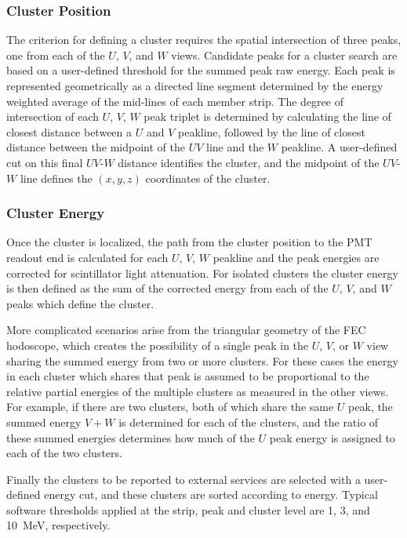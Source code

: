 \subsubsection {Cluster Position}

The criterion for defining a cluster requires the spatial intersection of three peaks, one from each of the $U$, $V$, and $W$ views.
Candidate peaks for a cluster search are based on a user-defined threshold for the summed peak raw energy.  Each peak is
represented geometrically as a directed line segment determined by the energy weighted average of the mid-lines of each
member strip.   The degree of intersection of each $U$, $V$, $W$ peak triplet is determined by calculating the line of
closest distance between a $U$ and $V$ peakline, followed by the line of closest distance between the midpoint of the $UV$
line and the $W$ peakline.  A user-defined cut on this final $UV$-$W$ distance identifies the cluster, and the midpoint of
the $UV$-$W$ line defines the $(x,y,z)$ coordinates of the cluster.

\subsubsection {Cluster Energy}

Once the cluster is localized, the path from the cluster position to the PMT readout end is calculated for each $U$, $V$,
$W$ peakline and the peak energies are corrected for scintillator light attenuation.  For isolated clusters the cluster energy
is then defined as the sum of the corrected energy from each of the $U$, $V$, and $W$ peaks which define the cluster.

More complicated scenarios arise from the triangular geometry of the FEC hodoscope, which creates the possibility of a
single peak in the $U$, $V$, or $W$ view sharing the summed energy from two or more clusters.  For these cases the energy
in each cluster which shares that peak is assumed to be proportional to the relative partial energies of the multiple clusters as
measured in the other views.  For example, if there are two clusters, both of which share the same $U$ peak, the summed
energy $V+W$ is determined for each of the clusters, and the ratio of these summed energies determines how much of the
$U$ peak energy is assigned to each of the two clusters.

Finally the clusters to be reported to external services are selected with a user-defined energy cut, and these clusters
are sorted according to energy. Typical software thresholds applied at the strip, peak and cluster level are 1, 3, and 10~MeV,
respectively.

